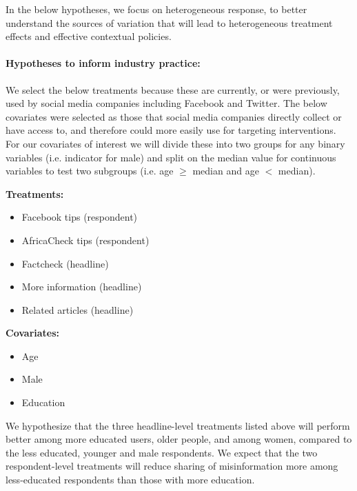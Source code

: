 \documentclass[letterpaper, 12pt, parskip=full,DIV=10]{scrartcl}
\begin{document}
{In the below hypotheses, we focus on heterogeneous response, to better understand the sources of variation that will lead to heterogeneous treatment effects and effective contextual policies.} 

\paragraph{Hypotheses to inform industry practice:}
We select the below treatments because these are currently, or were previously, used by social media companies including Facebook and Twitter. The below covariates were selected as those that social media companies directly collect or have access to, and therefore could more easily use for targeting interventions. For our covariates of interest we will divide these into two groups for any binary variables (i.e. indicator for male) and split on the median value for continuous variables to test two subgroups (i.e. age $\geq$ median and age $<$ median). 

\textbf{Treatments:}
\begin{itemize}
\item Facebook tips (respondent)
\item AfricaCheck tips (respondent)
\item Factcheck (headline)
\item More information (headline)
\item Related articles (headline)
\end{itemize}

\textbf{Covariates:}
\begin{itemize}
\item Age
\item Male
\item Education
\end{itemize}

We hypothesize that the three headline-level treatments listed above will perform better among more educated users, older people, and among women, compared to the less educated, younger and male respondents. We expect that the two respondent-level treatments will reduce sharing of misinformation more among less-educated respondents than those with more education. 
\end{document}
